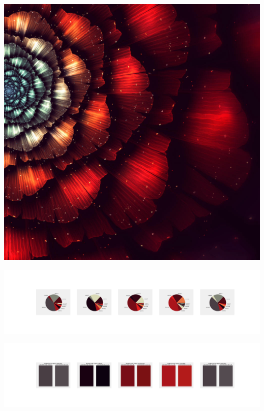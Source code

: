 \documentclass[11pt]{article}
\begin{document}
\begin{landscape}
    \begin{center}
    \includegraphics[width=\textwidth]{./nbimg/file (392).jpg}
    \end{center}

    \begin{center}
    \includegraphics[width=250mm]{./nbimg/pie-325.jpg}
    \end{center}

    \begin{center}
    \includegraphics[width=250mm]{./nbimg/peak-325.jpg}
    \end{center}
    


\end{landscape}
\end{document}
